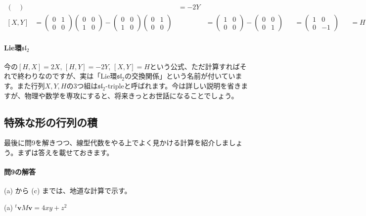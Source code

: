 \begin{align*}
\begin{pmatrix}
\end{pmatrix}
& &= -2Y \\
[X, Y]
&=
\begin{pmatrix}
0 & 1 \\
0 & 0
\end{pmatrix}
\begin{pmatrix}
0 & 0 \\
1 & 0
\end{pmatrix}
-
\begin{pmatrix}
0 & 0 \\
1 & 0
\end{pmatrix}
\begin{pmatrix}
0 & 1 \\
0 & 0
\end{pmatrix}
& &=
\begin{pmatrix}
1 & 0 \\
0 & 0
\end{pmatrix}
-
\begin{pmatrix}
0 & 0 \\
0 & 1
\end{pmatrix}
& &=
\begin{pmatrix}
1 & 0 \\
0 & -1
\end{pmatrix}
& &= H
\end{align*}

\paragraph{Lie環$\mathfrak{sl}_2$}
今の$[H, X] = 2X$, $[H, Y] = -2Y$, $[X, Y] = H$という公式、ただ計算すればそれで終わりなのですが、実は「Lie環$\mathfrak{sl}_2$の交換関係」という名前が付いています。また行列$X, Y, H$の$3$つ組は$\mathfrak{sl}_2$-tripleと呼ばれます。今は詳しい説明を省きますが、物理や数学を専攻にすると、将来きっとお世話になることでしょう。

\subsection{特殊な形の行列の積}

最後に問9を解きつつ、線型代数をやる上でよく見かける計算を紹介しましょう。まずは答えを載せておきます。

\paragraph{問9の解答} (a) から (c) までは、地道な計算で示す。

\noindent (a) ${}^t\bm{v}M\bm{v} = 4xy + z^2$ 

